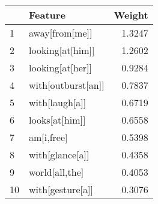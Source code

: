 \begin{tabular}{llr}
\toprule
{} &             Feature &  Weight \\
\midrule
1  &      away[from[me]] &  1.3247 \\
2  &    looking[at[him]] &  1.2602 \\
3  &    looking[at[her]] &  0.9284 \\
4  &  with[outburst[an]] &  0.7837 \\
5  &      with[laugh[a]] &  0.6719 \\
6  &      looks[at[him]] &  0.6558 \\
7  &          am[i,free] &  0.5398 \\
8  &     with[glance[a]] &  0.4358 \\
9  &      world[all,the] &  0.4053 \\
10 &    with[gesture[a]] &  0.3076 \\
\bottomrule
\end{tabular}

